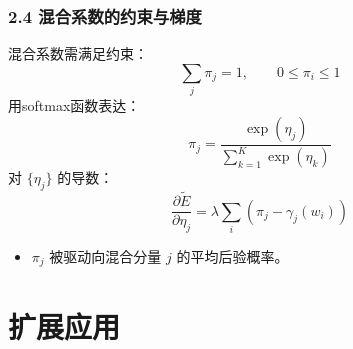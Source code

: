 \documentclass[t,aspectratio=169]{beamer} %
\begin{document}
\begin{frame}
    \frametitle{2.4 混合系数的约束与梯度}
    混合系数需满足约束：
    \begin{equation}
        \sum_j \pi_j = 1, \qquad 0 \leqslant \pi_i \leqslant 1
        \tag{9.29}
    \end{equation}
    用\alert{softmax}函数表达：
    \begin{equation}
        \pi_j = \frac{\exp(\eta_j)}{\sum_{k=1}^K \exp(\eta_k)}
        \tag{9.30}
    \end{equation}
    对 $\{\eta_j\}$ 的导数：
    \begin{equation}
        \frac{\partial \widetilde{E}}{\partial \eta_j} = \lambda \sum_i \left( \pi_j - \gamma_j(w_i) \right)
        \tag{9.31}
    \end{equation}
    \begin{itemize}
        \item $\pi_j$ 被驱动向混合分量 $j$ 的\alert{平均后验概率}。
    \end{itemize}
\end{frame}

\section{扩展应用}
\end{document}
